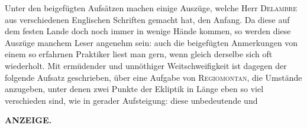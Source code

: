 Unter den beigefügten Aufsätzen machen einige Auszüge, welche Herr \textsc{Delambre} aus verschiedenen Englischen Schriften gemacht hat, den Anfang. Da diese auf dem festen Lande doch noch immer in wenige Hände kommen, so werden diese Auszüge manchem Leser angenehm sein: auch die beigefügten Anmerkungen von einem so erfahrnen Praktiker liest man gern, wenn gleich derselbe sich oft wiederholt. Mit ermüdender und unnöthiger Weitschweifigkeit ist dagegen der folgende Aufsatz geschrieben, über eine Aufgabe von \textsc{Regiomontan}, die Umstände anzugeben, unter denen zwei Punkte der Ekliptik in Länge eben so viel verschieden sind, wie in gerader Aufsteigung: diese unbedeutende und\par
\clearpage
\thispagestyle{empty}
\noindent{}%
%
\parbox[t]{\dimexpr\linewidth-24mm\relax}{\centering\footnotesize\bfseries ANZEIGE.\par}%
\makebox[12mm][r]{}\par\medskip
